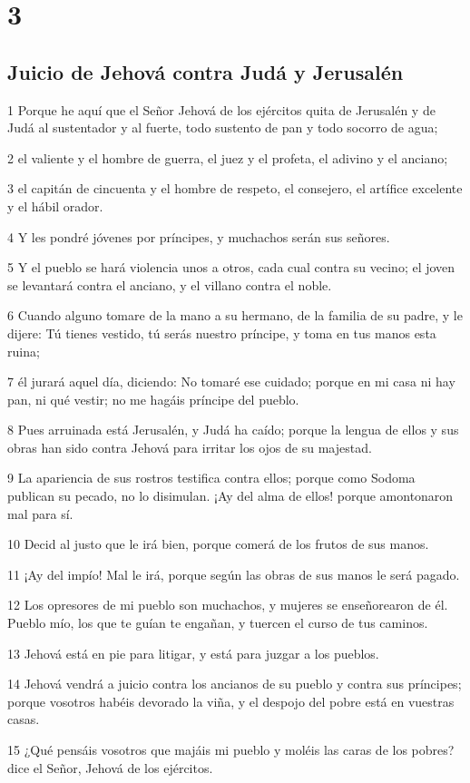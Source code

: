 \chapter{3}

\section*{Juicio de Jehová contra Judá y Jerusalén}

\par 1 Porque he aquí que el Señor Jehová de los ejércitos quita de Jerusalén y de Judá al sustentador y al fuerte, todo sustento de pan y todo socorro de agua;
\par 2 el valiente y el hombre de guerra, el juez y el profeta, el adivino y el anciano;
\par 3 el capitán de cincuenta y el hombre de respeto, el consejero, el artífice excelente y el hábil orador.
\par 4 Y les pondré jóvenes por príncipes, y muchachos serán sus señores.
\par 5 Y el pueblo se hará violencia unos a otros, cada cual contra su vecino; el joven se levantará contra el anciano, y el villano contra el noble.
\par 6 Cuando alguno tomare de la mano a su hermano, de la familia de su padre, y le dijere: Tú tienes vestido, tú serás nuestro príncipe, y toma en tus manos esta ruina;
\par 7 él jurará aquel día, diciendo: No tomaré ese cuidado; porque en mi casa ni hay pan, ni qué vestir; no me hagáis príncipe del pueblo.
\par 8 Pues arruinada está Jerusalén, y Judá ha caído; porque la lengua de ellos y sus obras han sido contra Jehová para irritar los ojos de su majestad.
\par 9 La apariencia de sus rostros testifica contra ellos; porque como Sodoma publican su pecado, no lo disimulan. ¡Ay del alma de ellos! porque amontonaron mal para sí.
\par 10 Decid al justo que le irá bien, porque comerá de los frutos de sus manos.
\par 11 ¡Ay del impío! Mal le irá, porque según las obras de sus manos le será pagado.
\par 12 Los opresores de mi pueblo son muchachos, y mujeres se enseñorearon de él. Pueblo mío, los que te guían te engañan, y tuercen el curso de tus caminos.
\par 13 Jehová está en pie para litigar, y está para juzgar a los pueblos.
\par 14 Jehová vendrá a juicio contra los ancianos de su pueblo y contra sus príncipes; porque vosotros habéis devorado la viña, y el despojo del pobre está en vuestras casas.
\par 15 ¿Qué pensáis vosotros que majáis mi pueblo y moléis las caras de los pobres? dice el Señor, Jehová de los ejércitos.


